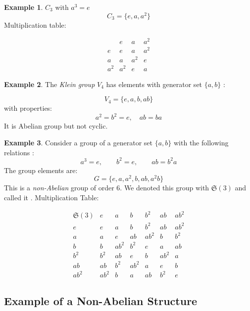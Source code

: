 \documentclass[a4paper,12pt]{article}
\theoremstyle{definition}
\newtheorem{example}{Example}[section]
\begin{document}
\begin{example}
    $C_3$ with $a^3 = e$
    \[
    C_3 = \{ e, a, a^2 \}
    \]
    Multiplication table:

    \[
    \begin{array}{c|ccc}
    & e & a & a^2 \\
    \hline
    e & e & a & a^2 \\
    a & a & a^2 & e \\
    a^2 & a^2 & e & a
    \end{array}
    \]

\end{example}

\begin{example}
    The \emph{Klein group} $V_4$ has elements with generator set $\{a, b\}$ :

    \[
    V_4 = \{ e, a, b, ab \}
    \]
    with properties:
    \[
    a^2 = b^2 = e, \quad ab = ba
    \]
    It is Abelian group but not cyclic.
\end{example}

\begin{example}
    
Consider a group of a generator set $\{a, b\}$ with the following relations :
\[
a^3 = e,
\qquad
b^2 = e,
\qquad
ab = b^{2}a
\]
The group elements are:
\[
G = \{ e, a, a^2, b, ab, a^2b \}
\]
This is a \emph{non-Abelian} group of order 6. We denoted this group with $\mathfrak{S}(3)$ and called it .
\newline
Multiplication Table:

\[
\begin{array}{c|cccccc}
\mathfrak{S}(3) & e & a & b & b^2 & ab & ab^2 \\ \hline
e & e & a & b & b^2 & ab & ab^2 \\ 
a & a & e & ab & ab^2 & b & b^2 \\ 
b & b & ab^2 & b^2 & e & a & ab \\ 
b^2 & b^2 & ab & e & b & ab^2 & a \\ 
ab & ab & b^2 & ab^2 & a & e & b \\ 
ab^2 & ab^2 & b & a & ab & b^2 & e 
\end{array}
\]
\end{example}

\subsection{Example of a Non-Abelian Structure}
\end{document}
